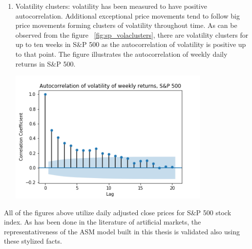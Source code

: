 \begin{enumerate}
\begin{minipage}{\linewidth}
        \label{fig:sp_autocorr}
    \end{minipage}
    \item Volatility clusters: volatility has been measured to have positive autocorrelation. 
          Additional exceptional price movements tend to follow big price movements forming clusters of volatility throughout time.
          As can be observed from the figure ~\ref{fig:sp_volaclusters}, there are volatility clusters for up to ten weeks in 
          S\&P 500 as the autocorrelation of volatility is positive up to that point. 
          The figure illustrates the autocorrelation of weekly daily returns in S\&P 500.  
    \par
    \begin{minipage}{\linewidth}
        \centering
        \includegraphics[width=10cm]{plots/S&P500_vola_autocorr.png}
        \label{fig:sp_volaclusters}
    \end{minipage}
\end{enumerate} 



All of the figures above utilize daily adjusted close prices for S\&P 500 stock index. 
As has been done in the literature of artificial markets, the 
representativeness of the ASM model built in this thesis is validated also 
using these stylized facts.